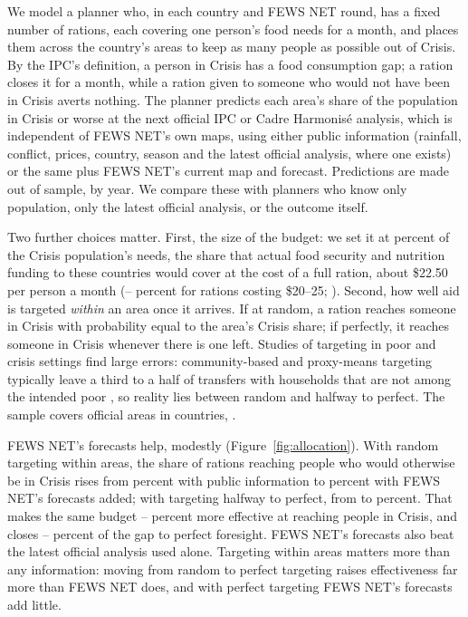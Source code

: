 \documentclass[11pt]{article}
\begin{document}
We model a planner who, in each country and FEWS NET round, has a fixed number of rations, each covering one person's food needs for a month, and places them across the country's areas to keep as many people as possible out of Crisis. By the IPC's definition, a person in Crisis has a food consumption gap; a ration closes it for a month, while a ration given to someone who would not have been in Crisis averts nothing. The planner predicts each area's share of the population in Crisis or worse at the next official IPC or Cadre Harmonis\'e analysis, which is independent of FEWS NET's own maps, using either public information (rainfall, conflict, prices, country, season and the latest official analysis, where one exists) or the same plus FEWS NET's current map and forecast. Predictions are made out of sample, by year. We compare these with planners who know only population, only the latest official analysis, or the outcome itself.

Two further choices matter. First, the size of the budget: we set it at \vmCover{} percent of the Crisis population's needs, the share that actual food security and nutrition funding to these countries would cover at the cost of a full ration, about \$22.50 per person a month (\vmCoverLo{}--\vmCoverHi{} percent for rations costing \$20--25; \citealp{wfp2023costinaction,somaliacwg2022tv}). Second, how well aid is targeted \emph{within} an area once it arrives. If at random, a ration reaches someone in Crisis with probability equal to the area's Crisis share; if perfectly, it reaches someone in Crisis whenever there is one left. Studies of targeting in poor and crisis settings find large errors: community-based and proxy-means targeting typically leave a third to a half of transfers with households that are not among the intended poor \citep{sabateswheeler2015targeting,brown2018poor,premand2021targeting}, so reality lies between random and halfway to perfect. The sample covers \vmAreas{} official areas in \vmCountries{} countries, \vmYears{}.

FEWS NET's forecasts help, modestly (Figure~\ref{fig:allocation}). With random targeting within areas, the share of rations reaching people who would otherwise be in Crisis rises from \vmRandPub{} percent with public information to \vmRandFews{} percent with FEWS NET's forecasts added; with targeting halfway to perfect, from \vmHalfPub{} to \vmHalfFews{} percent. That makes the same budget \vmHalfPctMore{}--\vmRandPctMore{} percent more effective at reaching people in Crisis, and closes \vmHalfOracleGain{}--\vmRandOracleGain{} percent of the gap to perfect foresight. FEWS NET's forecasts also beat the latest official analysis used alone. Targeting within areas matters more than any information: moving from random to perfect targeting raises effectiveness far more than FEWS NET does, and with perfect targeting FEWS NET's forecasts add little.
\end{document}

